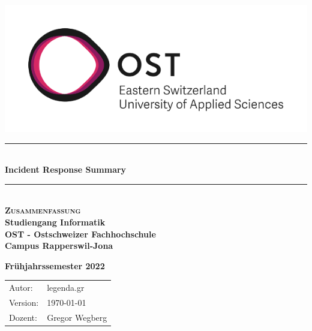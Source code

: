 


\begin{titlepage}


   \newcommand{\HRule}{\color{black}\rule{\linewidth}{0.5mm}} %
   
   \center
   
   \begin{minipage}{0.49\linewidth}
         \vspace{2pt}
        \hfill
   \end{minipage}
   \begin{minipage}{0.49\linewidth}
      \hfill
      \includegraphics[width=0.6\linewidth]{img/OST_Logo}
   \end{minipage}

   \vspace*{\fill}

   \vspace{1.5cm}

   {\HRule} \\[0.7cm]
   {\huge \bfseries Incident Response Summary}\\[0.4cm]
   
   {\HRule} \\[1.5cm]
   
   \textbf{\textsc{\Huge Zusammenfassung}}\\[1.5cm]
   
   \Large
   \textbf{Studiengang Informatik}\\
   \textbf{OST - Ostschweizer Fachhochschule}\\
   \textbf{Campus Rapperswil-Jona}\\
   
   \vspace{1cm}
   
   \textbf{Frühjahrssemester 2022}\\
   
   \vspace{1.5cm}

   \begin{center}
      \begin{tabular} {|p{3cm} p{4cm}|}
         Autor:          &     legenda.gr     \\
         Version:          &     \today         \\
         Dozent:         &     Gregor Wegberg    \\
      \end{tabular}
   \end{center}



   \vfill %

\end{titlepage}


\setcounter{tocdepth}{1}


